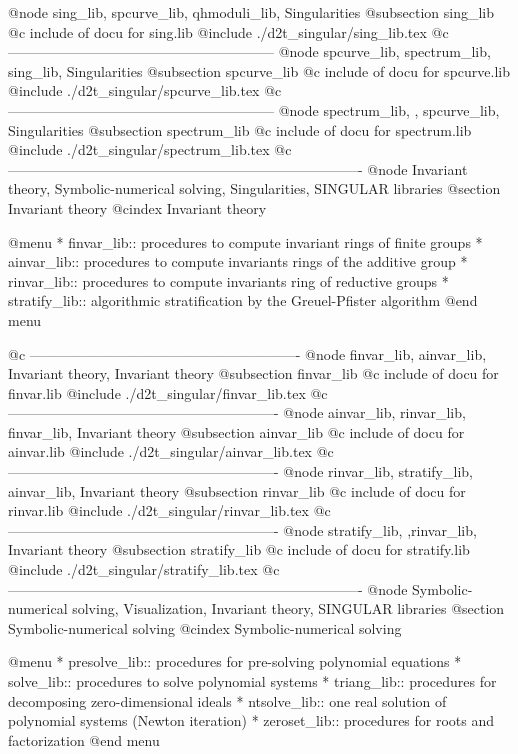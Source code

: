 @node sing_lib, spcurve_lib, qhmoduli_lib, Singularities
@subsection sing_lib
@c include of docu for sing.lib
@include ./d2t_singular/sing_lib.tex
@c ---------------------------------------------------------
@node spcurve_lib, spectrum_lib, sing_lib, Singularities
@subsection spcurve_lib
@c include of docu for spcurve.lib
@include ./d2t_singular/spcurve_lib.tex
@c ---------------------------------------------------------
@node spectrum_lib, , spcurve_lib, Singularities
@subsection spectrum_lib
@c include of docu for spectrum.lib
@include ./d2t_singular/spectrum_lib.tex
@c ----------------------------------------------------------------------------
@node Invariant theory, Symbolic-numerical solving, Singularities, SINGULAR libraries
@section Invariant theory
@cindex Invariant theory

@menu
* finvar_lib:: procedures to compute invariant rings of finite groups
* ainvar_lib:: procedures to compute invariants rings of the additive group
* rinvar_lib:: procedures to compute invariants ring of reductive groups
* stratify_lib:: algorithmic stratification by the Greuel-Pfister algorithm
@end menu

@c ----------------------------------------------------------
@node finvar_lib, ainvar_lib, Invariant theory, Invariant theory
@subsection finvar_lib
@c include of docu for finvar.lib
@include ./d2t_singular/finvar_lib.tex
@c ----------------------------------------------------------
@node ainvar_lib, rinvar_lib, finvar_lib, Invariant theory
@subsection ainvar_lib
@c include of docu for ainvar.lib
@include ./d2t_singular/ainvar_lib.tex
@c ----------------------------------------------------------
@node rinvar_lib, stratify_lib, ainvar_lib, Invariant theory
@subsection rinvar_lib
@c include of docu for rinvar.lib
@include ./d2t_singular/rinvar_lib.tex
@c ----------------------------------------------------------
@node stratify_lib, ,rinvar_lib, Invariant theory
@subsection stratify_lib
@c include of docu for stratify.lib
@include ./d2t_singular/stratify_lib.tex
@c ----------------------------------------------------------------------------
@node Symbolic-numerical solving, Visualization, Invariant theory, SINGULAR libraries
@section Symbolic-numerical solving
@cindex Symbolic-numerical solving

@menu
* presolve_lib:: procedures for pre-solving polynomial equations
* solve_lib:: procedures to solve polynomial systems
* triang_lib:: procedures for decomposing zero-dimensional ideals
* ntsolve_lib:: one real solution of polynomial systems (Newton iteration)
* zeroset_lib:: procedures for roots and factorization
@end menu

